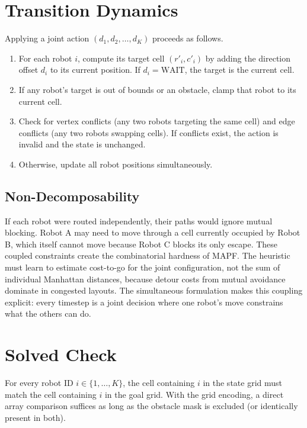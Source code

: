 \documentclass[11pt]{article}
\begin{document}
\section{Transition Dynamics}

Applying a joint action $(d_1, d_2, \ldots, d_K)$ proceeds as follows.

\begin{enumerate}[nosep]
    \item For each robot $i$, compute its target cell $(r'_i, c'_i)$ by adding the direction offset $d_i$ to its current position. If $d_i = \text{WAIT}$, the target is the current cell.
    \item If any robot's target is out of bounds or an obstacle, clamp that robot to its current cell.
    \item Check for vertex conflicts (any two robots targeting the same cell) and edge conflicts (any two robots swapping cells). If conflicts exist, the action is invalid and the state is unchanged.
    \item Otherwise, update all robot positions simultaneously.
\end{enumerate}

\subsection{Non-Decomposability}

If each robot were routed independently, their paths would ignore mutual blocking. Robot A may need to move through a cell currently occupied by Robot B, which itself cannot move because Robot C blocks its only escape. These coupled constraints create the combinatorial hardness of MAPF. The heuristic must learn to estimate cost-to-go for the joint configuration, not the sum of individual Manhattan distances, because detour costs from mutual avoidance dominate in congested layouts. The simultaneous formulation makes this coupling explicit: every timestep is a joint decision where one robot's move constrains what the others can do.

\section{Solved Check}

For every robot ID $i \in \{1, \ldots, K\}$, the cell containing $i$ in the state grid must match the cell containing $i$ in the goal grid. With the grid encoding, a direct array comparison suffices as long as the obstacle mask is excluded (or identically present in both).
\end{document}

